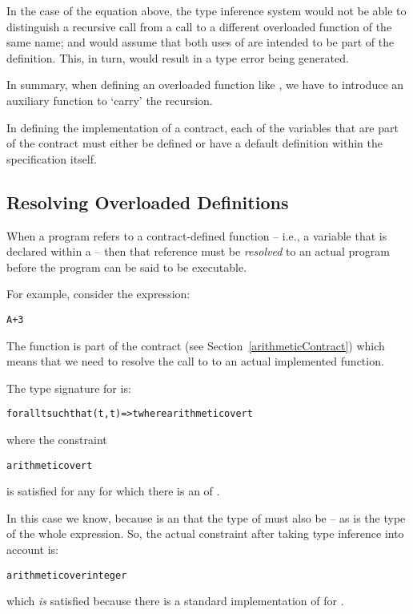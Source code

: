 \begin{aside}
\begin{aside}
In the case of the \q{<=} equation above, the type inference system would not be able to distinguish a recursive call from a call to a different overloaded function of the same name; and would assume that both uses of \q{<=} are intended to be part of the definition. This, in turn, would result in a type error being generated.

In summary, when defining an overloaded function like \q{<=}, we have to introduce an auxiliary function to `carry' the recursion.
\end{aside}
\end{aside}

In defining the implementation of a contract, each of the variables that are part of the contract must either be defined or have a default definition within the  specification itself.

\subsection{Resolving Overloaded Definitions}
\label{overloading}

When a program refers to a contract-defined function -- i.e., a variable that is declared within a  -- then that reference must be \emph{resolved} to an actual program before the program can be said to be executable.

For example, consider the expression:
\begin{alltt}
A+3
\end{alltt}
The \q{(+)} function is part of the  contract (see Section~\vref{arithmeticContract}) which means that we need to resolve the call to \q{(+)} to an actual implemented function.

The type signature for \q{(+)} is:
\begin{alltt}
for all t such that (t,t)=>t where arithmetic over t
\end{alltt}
where the constraint
\begin{alltt}
arithmetic over t
\end{alltt}
is satisfied for any  for which there is an  of . 

In this case we know, because  is an  that the type of  must also be  -- as is the type of the whole expression. So, the actual constraint after taking type inference into account is:
\begin{alltt}
arithmetic over integer
\end{alltt}
which \emph{is} satisfied because there is a standard implementation of  for .

